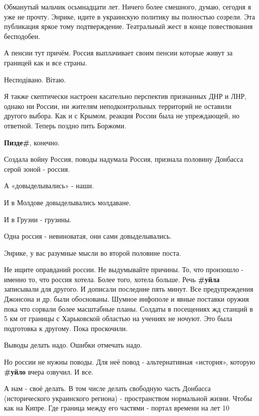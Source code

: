 \begin{itemize}

Обманутый мальчик осьмнадцати лет. Ничего более смешного, думаю, сегодня я уже
не прочту. Энрике, идите в украинскую политику вы полностью созрели. Эта
публикация яркое тому подтверждение. Театральный жест в конце повествования
бесподобен.

А пенсии тут причём. Россия выплачивает своим пенсии которые живут за границей как и все страны.

Несподівано. Вітаю.


Я также скептически настроен касательно перспектив признанных ДНР и ЛНР, однако
ни России, ни жителям неподконтрольных территорий не оставили другого выбора.
Как и с Крымом, реакция России была не упреждающей, но ответной. Теперь поздно
пить Боржоми.


\textbf{Пизде\#}, конечно.

Создала войну Россия, поводы надумала Россия, признала половину Донбасса серой
зоной - россия.

А «довыделывались» - наши.

И в Молдове довыделывались молдаване.

И в Грузии - грузины.

Одна россия - невиноватая, они сами довыделывались.

Энрике, у вас разумные мысли во второй половине поста.

Не ищите оправданий россии. Не выдумывайте причины. То, что произошло - именно
то, что россия хотела. Более того, хотела больше. Речь \textbf{\#уйла}
записывали для другого. И дописали последние пять минут. Все предупреждения
Джонсона и др.  были обоснованы. Шумное инфополе и явные поставки оружия пока
что сорвали более масштабные планы. Солдаты в посещениях жд станций в 5 км от
границы с Харьковской областью на учениях не ночуют. Это была подготовка к
другому. Пока проскочили.

Выводы делать надо. Ошибки отмечать надо.

Но россии не нужны поводы. Для неё повод - альтернативная «история», которую
\textbf{\#уйло} вчера озвучил. И все.

А нам - своё делать. В том числе делать свободную часть Донбасса (исторического
украинского региона) - пространством нормальной жизни. Чтобы как на Кипре. Где
граница между его частями - портал времени на лет 10


\end{itemize}
